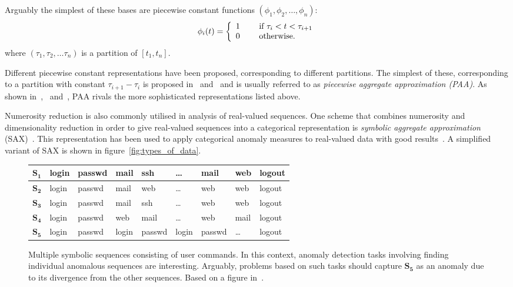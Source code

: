 Arguably the simplest of these bases are piecewise constant functions $(\phi_1, \phi_2, \dots, \phi_n)$:
\[
  \phi_i(t) = \left\{
    \begin{array}{l l}
      1 & \quad \text{ if } \tau_i < t < \tau_{i+1} \\
      0 & \quad \text{ otherwise.} \\
    \end{array} \right.
\]
where $(\tau_1, \tau_2, \dots \tau_n)$ is a partition of $[t_1, t_n]$.

Different piecewise constant representations have been proposed, corresponding to different partitions. The simplest of these, corresponding to a partition with constant $\tau_{i+1} - \tau_i$ is proposed in~\cite{keogh4} and~\cite{faloutsos2} and is usually referred to as \emph{piecewise aggregate approximation (PAA)}. As shown in~\cite{keogh5},~\cite{keogh3} and~\cite{faloutsos2}, PAA rivals the more sophisticated representations listed above.

Numerosity reduction is also commonly utilised in analysis of real-valued sequences. One scheme that combines numerosity and dimensionality reduction in order to give real-valued sequences into a categorical representation is \emph{symbolic aggregate approximation} (SAX)~\cite{sax}. This representation has been used to apply categorical anomaly measures to real-valued data with good results~\cite{TODO}. A simplified variant of SAX is shown in figure~\ref{fig:types_of_data}.

\begin{figure}[htb]
    \begin{center}
        \begin{tabular}{| l | l l l l l l l l |}
            \hline
            $\mathbf{S_1}$ & login & passwd & mail & ssh & \dots & mail & web & logout \\ \hline
            $\mathbf{S_2}$ & login & passwd & mail & web & \dots & web & web & logout \\ \hline
            $\mathbf{S_3}$ & login & passwd & mail & ssh & \dots & web & web & logout \\ \hline
            $\mathbf{S_4}$ & login & passwd & web & mail & \dots & web & mail & logout \\ \hline
            $\mathbf{S_5}$ & login & passwd & login & passwd & login & passwd & \dots & logout \\\hline
        \end{tabular}
    \end{center}
    \caption{{\small Multiple symbolic sequences consisting of user commands. In this context, anomaly detection tasks involving finding individual anomalous sequences are interesting. Arguably, problems based on such tasks should capture $\mathbf{S_5}$ as an anomaly due to its divergence from the other sequences. Based on a figure in~\cite{chandola2}.}}
\label{fig:calls}
\end{figure}


